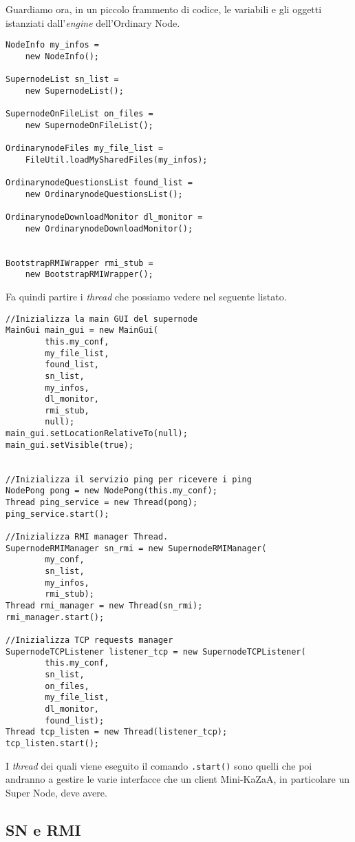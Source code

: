 Guardiamo ora, in un piccolo frammento di codice, le variabili e gli oggetti istanziati dall'\emph{engine} dell'Ordinary Node.
\begin{lstlisting}
NodeInfo my_infos = 
	new NodeInfo();

SupernodeList sn_list = 
	new SupernodeList();

SupernodeOnFileList on_files = 
	new SupernodeOnFileList();

OrdinarynodeFiles my_file_list = 
	FileUtil.loadMySharedFiles(my_infos);

OrdinarynodeQuestionsList found_list = 
	new OrdinarynodeQuestionsList();

OrdinarynodeDownloadMonitor dl_monitor = 
	new OrdinarynodeDownloadMonitor();


BootstrapRMIWrapper rmi_stub = 
	new BootstrapRMIWrapper();
\end{lstlisting}
Fa quindi partire i \emph{thread} che possiamo vedere nel seguente listato.
\begin{lstlisting}
//Inizializza la main GUI del supernode
MainGui main_gui = new MainGui(
		this.my_conf,
		my_file_list,
		found_list,
		sn_list,
		my_infos,
		dl_monitor,
		rmi_stub,
		null);
main_gui.setLocationRelativeTo(null);
main_gui.setVisible(true);

	
//Inizializza il servizio ping per ricevere i ping
NodePong pong = new NodePong(this.my_conf);
Thread ping_service = new Thread(pong);
ping_service.start();

//Inizializza RMI manager Thread.
SupernodeRMIManager sn_rmi = new SupernodeRMIManager(
		my_conf,
		sn_list,
		my_infos,
		rmi_stub);
Thread rmi_manager = new Thread(sn_rmi);
rmi_manager.start();

//Inizializza TCP requests manager
SupernodeTCPListener listener_tcp = new SupernodeTCPListener(
		this.my_conf,
		sn_list,
		on_files,
		my_file_list,
		dl_monitor,
		found_list);
Thread tcp_listen = new Thread(listener_tcp);
tcp_listen.start();
\end{lstlisting}
I \emph{thread} dei quali viene eseguito il comando \verb|.start()| sono quelli che poi andranno a gestire le varie interfacce che un client Mini-KaZaA, in particolare un Super Node, deve avere.

\subsection{SN e RMI}

